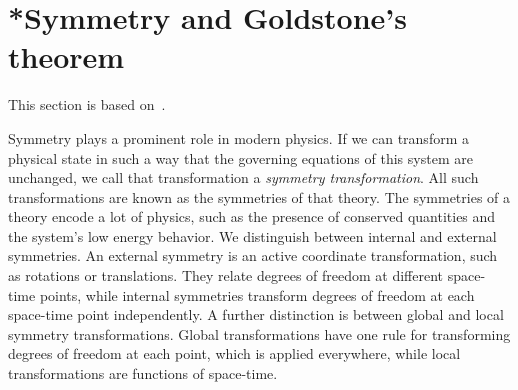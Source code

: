 \section{*Symmetry and Goldstone's theorem}
\label{section: symmetry and goldstone's theorem}

This section is based on~\autocite{leeIntroductionSmoothManifolds2003d,peskinIntroductionQuantumField1995,schwartzQuantumFieldTheory2013,weinbergQuantumTheoryFields1995,weinbergQuantumTheoryFields1996}.

Symmetry plays a prominent role in modern physics.
If we can transform a physical state in such a way that the governing equations of this system are unchanged, we call that transformation a \emph{symmetry transformation}.
All such transformations are known as the symmetries of that theory.
The symmetries of a theory encode a lot of physics, such as the presence of conserved quantities and the system's low energy behavior.
We distinguish between internal and external symmetries.
An external symmetry is an active coordinate transformation, such as rotations or translations.
They relate degrees of freedom at different space-time points, while internal symmetries transform degrees of freedom at each space-time point independently.
A further distinction is between global and local symmetry transformations.
Global transformations have one rule for transforming degrees of freedom at each point, which is applied everywhere, while local transformations are functions of space-time.

